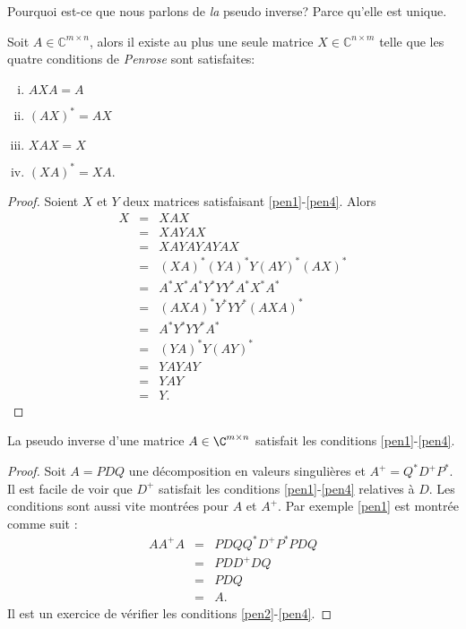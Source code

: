 Pourquoi est-ce que nous parlons de \emph{la} pseudo inverse? Parce qu'elle est unique. 

\begin{theorem}
  \label{thr:22}
  Soit  $A \in ℂ^{m \times n}$, alors il existe au plus une seule matrice $X \in ℂ^{n \times m}$  telle que les quatre conditions de \emph{Penrose} sont satisfaites: 
  \begin{enumerate}[i)] 
  \item $AXA = A$ \label{pen1}
  \item $(AX)^* = AX$ \label{pen2}
  \item $XAX = X$ \label{pen3}
  \item $(XA)^* = XA$. \label{pen4}
  \end{enumerate}
\end{theorem}
\begin{proof}
  Soient $X$ et $Y$ deux matrices satisfaisant \ref{pen1}-\ref{pen4}. Alors
  \begin{eqnarray*}
    X & = & XAX \\
     & = & XAYAX \\
     & = & XAYAYAYAX\\
    & = & (XA)^*(YA)^*Y(AY)^*(AX)^*\\
    & = & A^*X^*A^*Y^*YY^*A^*X^*A^* \\
    & = & (AXA)^*Y^*YY^*(AXA)^* \\
    & = & A^* Y^* Y Y^* A^* \\
    & = & (YA)^* Y (AY)^* \\
    & = & YAYAY \\
    & = & YAY \\
    & = & Y. 
  \end{eqnarray*}
\end{proof}

\begin{theorem}
  \label{thr:23}
  La pseudo inverse d'une matrice $A \in \C^{m \times n}$ satisfait les conditions \ref{pen1}-\ref{pen4}. 
\end{theorem}

\begin{proof}
  Soit $A = PDQ$ une décomposition en valeurs singulières et $A^+ = Q^*D^+P^*$.  Il est facile de voir que $D^+$ satisfait les conditions \ref{pen1}-\ref{pen4} relatives à $D$. Les conditions sont aussi vite montrées pour $A$ et $A^+$. Par exemple \ref{pen1} est montrée comme suit : 
  \begin{eqnarray*}
    A A^+A & = & PDQQ^*D^+P^*PDQ \\
           & = & PDD^+DQ \\
           & = & PDQ\\
           & = & A. 
  \end{eqnarray*}
Il est un exercice de vérifier les  conditions \ref{pen2}-\ref{pen4}.
\end{proof}


